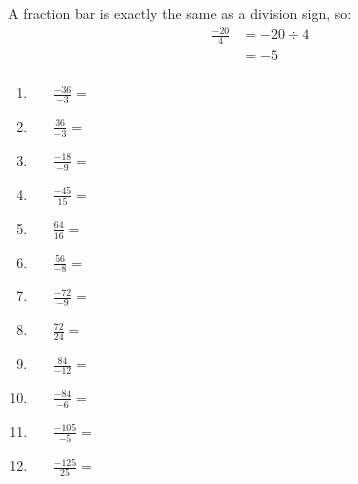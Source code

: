\documentclass[a4paper,12pt]{article}
\begin{document}
\newpage
\begin{tcolorbox}[colback=red!0!white, colframe=gray ,title=\subsubsection{Work out the following sums.}\label{multInt3}]
	A fraction bar is exactly the same as a division sign, so:
	\begin{align*}
 \frac{-20}{4}&=-20 \div 4 \\
 &= -5\\
	\end{align*}
	 
	\begin{multicols}{3}
		\begin{enumerate}[label=\footnotesize \roman*)]
			\item~~~$\displaystyle \frac{-36}{-3}=$
			\item~~~$\displaystyle \frac{36}{-3}=$
			\item~~~$\displaystyle \frac{-18}{-9}=$
			\item~~~$\displaystyle \frac{-45}{15}=$
			\item~~~$\displaystyle \frac{64}{16}=$
			\item~~~$\displaystyle \frac{56}{-8}=$
			\item~~~$\displaystyle \frac{-72}{-9}=$
			\item~~~$\displaystyle \frac{72}{24}=$
			\item~~~$\displaystyle \frac{84}{-12}=$
			\item~~~$\displaystyle \frac{-84}{-6}=$
			\item~~~$\displaystyle \frac{-105}{-5}=$
			\item~~~$\displaystyle \frac{-125}{25}=$
		\end{enumerate}
	\end{multicols}
\end{tcolorbox}\vspace{0.75cm}
\end{document}
